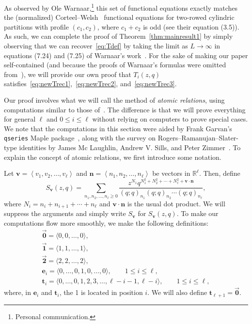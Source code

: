 \documentclass[pdftex]{sigma}
\numberwithin{equation}{section}
\theoremstyle{definition}
\newcommand{\RR}{\mathbb{R}}
\newcommand{\tr}{\mathbf{t}}
\newcommand{\nn}{\mathbf{n}}
\newcommand{\vv}{\mathbf{v}}
\newcommand{\ee}{\mathbf{e}}
\newcommand{\two}{\vec{\mathbf{2}}}
\newcommand{\one}{\vec{\mathbf{1}}}
\newcommand{\zero}{\vec{\mathbf{0}}}
\begin{document}
As observed by Ole Warnaar,\footnote{Personal communication.} this set of functional equations exactly matches the (normalized) Corteel--Welsh~\cite{CW} functional equations for two-rowed cylindric partitions with profile $(c_1,c_2)$, where $c_1+c_2$ is odd (see their equation (3.5)). As such, we can complete the proof of Theorem~\ref{thm:mainresult1} by simply observing that we can recover~\eqref{eq:Tdef} by taking the limit as $L\to\infty$ in equations (7.24) and (7.25) of Warnaar's work~\cite{WarnCyl}. For the sake of making our paper self-contained (and because the proofs of Warnaar's formulas were omitted from~\cite{WarnCyl}), we will provide our own proof that $T_i(z,q)$ satisfies~\eqref{eq:newTrec1},~\eqref{eq:newTrec2}, and~\eqref{eq:newTrec3}.

Our proof involves what we will call the method of {\it atomic relations}, using computations similar to those of~\cite{BKRS,KanRus-cylindric}. The difference is that we will prove everything for general $\ell$ and $0\le i \le \ell$ without relying on computers to prove special cases. We note that the computations in this section were aided by Frank Garvan's {\tt qseries} Maple package~\cite{Gar}, along with the survey on Rogers--Ramanujan--Slater-type identities by James Mc Laughlin, Andrew V. Sills, and Peter Zimmer~\cite{MSZ}. To explain the concept of atomic relations, we first introduce some notation.

Let $\vv = \left\langle v_1,v_2,\dots,v_{\ell}\right\rangle$ and $\nn = \left\langle n_1,n_2,\dots,n_{\ell}\right\rangle$ be vectors in $\RR^\ell$. Then, define
\begin{equation*}
S_\vv(z,q)=\sum_{n_1,n_2,\dots,n_{\ell}\ge 0} \frac{z^{N_1}q^{N_1^2+N_2^2+\cdots+N_{\ell}^2+\vv \cdot \nn}}{(q;q)_{n_1}(q;q)_{n_2}\cdots(q;q)_{n_{\ell}}},
\end{equation*}
where $N_i = n_i +n_{i+1}+\cdots+n_{\ell}$ and $\vv\cdot \nn$ is the usual dot product. We will suppress the arguments and simply write $S_\vv$ for $S_\vv(z,q)$. To make our computations flow more smoothly, we make the following definitions:
\begin{gather*}
\zero = \langle 0,0,\dots,0\rangle, \\
\one = \langle 1,1,\dots,1\rangle, \\
\two = \langle 2,2,\dots,2\rangle, \\
\ee_i = \langle 0, \dots, 0, 1, 0, \dots, 0 \rangle, \qquad 1 \le i \le \ell, \\
\tr_i = \langle 0, \dots, 0, 1, 2, 3, \dots, \ell-i-1, \ell-i \rangle, \qquad 1 \le i \le \ell,
\end{gather*}
where, in $\ee_i$ and $\tr_i$, the 1 is located in position $i$. We will also define $\tr_{\ell+1} = \zero$.
\end{document}
